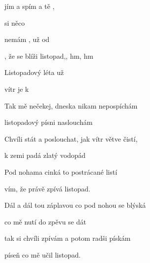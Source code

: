 

\zs
{} jím a  spím a  tě , 

 si  něco  

 nemám , už od   

, že se blíži listopad,, hm, hm 
\ks

\zr
Listopadový  léta už  

vítr   je k  

Tak mě nečekej, dneska nikam nepospíchám 

listopadový písni naslouchám 
\kr

\zs
Chvíli stát a poslouchat, jak vítr větve čistí, 

k zemi padá zlatý vodopád 

Pod nohama cinká to postrácané listí 

vím, že právě zpívá listopad. 
\ks

\zr

\kr

\zs
Dál a dál tou záplavou co pod nohou se blýská 

co mě nutí do zpěvu se dát 

tak si chvíli zpívám a potom radši pískám 

píseň co mě učil listopad.
\ks

\zr
\kr

\kp






















